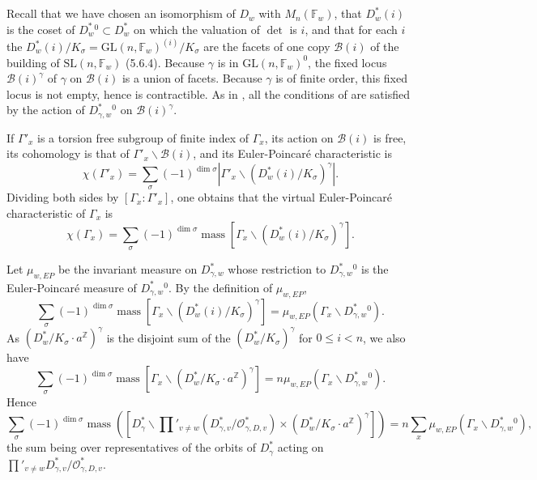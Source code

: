 \documentclass[11pt,a4paper]{article}
\theoremstyle{plain}
\theoremstyle{definition}
\DeclareMathOperator{\mass}{mass}
\newcommand{\Z}{\mathbb{Z}}
\newcommand{\GL}{\mathrm{GL}}
\newcommand{\SL}{\mathrm{SL}}
\begin{document}
\subsection{}
Recall that we have chosen an isomorphism of $D_w$ with $M_n(\mathbb{F}_w)$, that $D_w^*(i)$ is the coset of $D_w^*{}^0 \subset D_w^*$ on which the valuation of $\det$ is $i$, and that for each $i$ the $D_w^*(i)/K_\sigma = \GL(n, \mathbb{F}_w)^{(i)}/K_\sigma$ are the facets of one copy $\mathcal{B}(i)$ of the building of $\SL(n, \mathbb{F}_w)$ (5.6.4). Because $\gamma$ is in $\GL(n, \mathbb{F}_w)^0$, the fixed locus $\mathcal{B}(i)^\gamma$ of $\gamma$ on $\mathcal{B}(i)$ is a union of facets. Because $\gamma$ is of finite order, this fixed locus is not empty, hence is contractible. As in \cite[p. 635]{K}, all the conditions of \cite[3.3]{S} are satisfied by the action of $D_{\gamma,w}^*{}^0$ on $\mathcal{B}(i)^\gamma$.

If $\Gamma'_x$ is a torsion free subgroup of finite index of $\Gamma_x$, its action on $\mathcal{B}(i)$ is free, its cohomology is that of $\Gamma'_x \backslash \mathcal{B}(i)$, and its Euler-Poincar\'e characteristic is
\[
\chi(\Gamma'_x) = \sum_\sigma (-1)^{\dim \sigma} |\Gamma'_x \backslash (D_w^*(i)/K_\sigma)^\gamma|.
\]
Dividing both sides by $[\Gamma_x : \Gamma'_x]$, one obtains that the virtual Euler-Poincar\'e characteristic of $\Gamma_x$ is
\begin{equation}
\chi(\Gamma_x) = \sum_\sigma (-1)^{\dim \sigma} \mass[\Gamma_x \backslash (D_w^*(i)/K_\sigma)^\gamma]. \tag{5.15.1}
\end{equation}

Let $\mu_{w,EP}$ be the invariant measure on $D_{\gamma,w}^*$ whose restriction to $D_{\gamma,w}^*{}^0$ is the Euler-Poincar\'e measure of $D_{\gamma,w}^*{}^0$. By the definition of $\mu_{w,EP}$,
\[
\sum_\sigma (-1)^{\dim \sigma} \mass[\Gamma_x \backslash (D_w^*(i)/K_\sigma)^\gamma] = \mu_{w,EP}(\Gamma_x \backslash D_{\gamma,w}^*{}^0).
\]
As $(D_w^*/K_\sigma \cdot a^{\Z})^\gamma$ is the disjoint sum of the $(D_w^*/K_\sigma)^\gamma$ for $0 \leq i < n$, we also have
\[
\sum_\sigma (-1)^{\dim \sigma} \mass[\Gamma_x \backslash (D_w^*/K_\sigma \cdot a^{\Z})^\gamma] = n \mu_{w,EP}(\Gamma_x \backslash D_{\gamma,w}^*{}^0).
\]
Hence
\begin{equation}
\sum_\sigma (-1)^{\dim \sigma} \mass([D_\gamma^* \backslash \prod'_{v \neq w} (D_{\gamma,v}^*/\mathcal{O}_{\gamma,D,v}^*) \times (D_w^*/K_\sigma \cdot a^{\Z})^\gamma]) = n \sum_x \mu_{w,EP}(\Gamma_x \backslash D_{\gamma,w}^*{}^0), \tag{5.15.2}
\end{equation}
the sum being over representatives of the orbits of $D_\gamma^*$ acting on $\prod'_{v \neq w} D_{\gamma,v}^*/\mathcal{O}_{\gamma,D,v}^*$.
\end{document}
